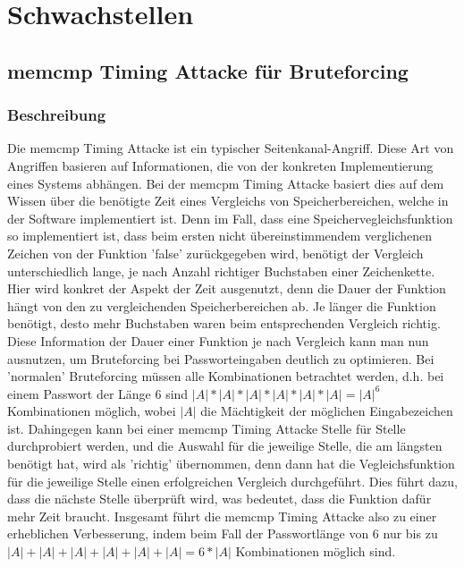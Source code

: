 \documentclass[a4paper,
DIV=13,
12pt,
BCOR=10mm,
department=FakIM,
oneside,
parskip=half,
automark,
listof=totocnumbered,
bibliography=totocnumbered,
acronym=totocnumbered
] {OTHRartcl}
\begin{document}
\section{Schwachstellen}
\label{sec:Schwachstellen}
\subsection{memcmp Timing Attacke für Bruteforcing}
\subsubsection{Beschreibung}
Die memcmp Timing Attacke ist ein typischer Seitenkanal-Angriff. Diese Art von Angriffen basieren auf Informationen, die von der konkreten Implementierung eines Systems abhängen.
Bei der memcpm Timing Attacke basiert dies auf dem Wissen über die benötigte Zeit eines Vergleichs von Speicherbereichen, welche in der Software implementiert ist.
Denn im Fall, dass eine Speichervegleichsfunktion so implementiert ist, dass beim ersten nicht übereinstimmendem verglichenen Zeichen von der Funktion 'false' zurückgegeben wird,
benötigt der Vergleich unterschiedlich lange, je nach Anzahl richtiger Buchstaben einer Zeichenkette.
Hier wird konkret der Aspekt der Zeit ausgenutzt, denn die Dauer der Funktion hängt von den zu vergleichenden Speicherbereichen ab.
Je länger die Funktion benötigt, desto mehr Buchstaben waren beim entsprechenden Vergleich richtig.
Diese Information der Dauer einer Funktion je nach Vergleich kann man nun ausnutzen, um Bruteforcing bei Passworteingaben deutlich zu optimieren.
Bei 'normalen' Bruteforcing müssen alle Kombinationen betrachtet werden, d.h.
bei einem Passwort der Länge 6 sind $|A|*|A|*|A|*|A|*|A|*|A| = |A|^6$ Kombinationen möglich, wobei $|A|$ die Mächtigkeit der möglichen Eingabezeichen ist.
Dahingegen kann bei einer memcmp Timing Attacke Stelle für Stelle durchprobiert werden, und die Auswahl für die jeweilige Stelle, die am längsten benötigt hat,
wird als 'richtig' übernommen, denn dann hat die Vegleichsfunktion für die jeweilige Stelle einen erfolgreichen Vergleich durchgeführt.
Dies führt dazu, dass die nächste Stelle überprüft wird, was bedeutet, dass die Funktion dafür mehr Zeit braucht.
Insgesamt führt die memcmp Timing Attacke also zu einer erheblichen Verbesserung, indem beim Fall der Passwortlänge von 6
nur bis zu $ |A|+|A|+|A|+|A|+|A|+|A| = 6 * |A| $ Kombinationen möglich sind.
\end{document}
